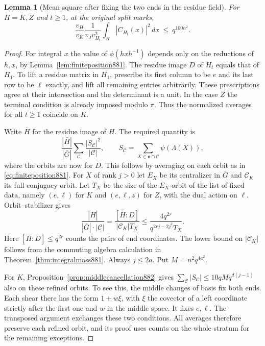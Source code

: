\documentclass[a4paper,11pt]{article}
\newtheorem{lemma}[proposition]{Lemma}
\theoremstyle{definition}
\theoremstyle{remark}
\numberwithin{equation}{section}
\begin{document}
\begin{lemma}[Mean square after fixing the two ends in the residue field]
\leavevmode\label{lem:residueends892}
For \(H=K,Z\) and \(t\ge1\), at the original split marks,
\[
 \frac{v_H}{v_K}\frac1{v_Jv_{H_t}^2}
             \int_K |C_{H_t}(x)|^2\,dx \ \le\ q^{100n^2}.
\]
\end{lemma}
\begin{proof}
For integral \(x\) the value of \(\phi(hxh^{-1})\) depends only
on the reductions of \(h,x\), by Lemma~\ref{lem:finiteposition881}.
The residue image \(D\) of \(H_t\) equals that of \(H_1\). To lift
a residue matrix in \(H_1\), prescribe its first column to be \(e\)
and its last row to be \(\ell\) exactly, and lift all remaining
entries arbitrarily. These prescriptions agree at their intersection
and the determinant is a unit. In the case \(Z\) the terminal
condition is already imposed modulo \(\pi\). Thus the normalized
averages for all \(t\ge1\) coincide on \(K\).

Write \(\bar H\) for the residue image of \(H\). The required
quantity is
\[
 \frac{|\bar H|}{|\bar G|}
       \sum_{\mathcal C}\frac{|S_{\mathcal C}|^2}{|\mathcal C|},
 \qquad
 S_{\mathcal C}=\sum_{X\in\mathfrak n\cap\mathcal C}\psi(\Lambda(X)),
\]
where the orbits are now for \(D\). This follows by averaging on
each orbit as in \eqref{eq:finiteposition881}. For \(X\) of
rank \(j>0\) let \(E_X\) be its centralizer in \(\bar G\) and
\(\mathcal C_K\) its full conjugacy orbit. Let \(T_X\) be the
size of the \(E_X\)-orbit of the list of fixed data, namely
\((e,\ell)\) for \(K\) and \((e,\ell,z)\) for \(Z\), with the
dual action on \(\ell\). Orbit--stabilizer gives
\[
 \frac{|\bar H|}{|\bar G|\cdot|\mathcal C|}
   =\frac{[\bar H:D]}{|\mathcal C_K| T_X}
   \le\frac{4q^{2r}}{q^{2rj-2j^2} T_X}.
\]
Here \([\bar H:D]\le q^{2r}\) counts the pairs of end coordinates.
The lower bound on \(|\mathcal C_K|\) follows from the commuting
algebra calculation in Theorem~\ref{thm:integralmass881}.
Always \(j\le2a\). Put \(M=n^2q^{4a^2}\).

For \(K\), Proposition~\ref{prop:middlecancellation882} gives
\(\sum_{\mathcal C}|S_{\mathcal C}|\le10qM q^{d(j-1)}\)
also on these refined orbits. To see this, the middle changes
of basis fix both ends. Each shear there has the form \(1+w\xi\),
with \(\xi\) the covector of a left coordinate strictly after
the first one and \(w\) in the middle space. It fixes \(e,\ell\).
The transposed argument exchanges these two conditions. All
averages therefore preserve each refined orbit, and its proof
uses counts on the whole stratum for the remaining exceptions.


\end{proof}
\end{document}
